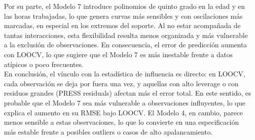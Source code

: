 \documentclass[12pt,a4paper,onecolumn]{article}
\begin{document}
Por su parte, el Modelo 7 introduce polinomios de quinto grado en la edad y en las horas trabajadas, lo que genera curvas más sensibles y con oscilaciones más marcadas, en especial en los extremos del soporte. Al no estar acompañada de tantas interacciones, esta flexibilidad resulta menos organizada y más vulnerable a la exclusión de observaciones. En consecuencia, el error de predicción aumenta con LOOCV, lo que sugiere que el Modelo 7 es más inestable frente a datos atípicos o poco frecuentes.\\

En conclusión, el vínculo con la estadística de influencia es directo: en LOOCV, cada observación se deja por fuera una vez, y aquellas con alto leverage o con residuos grandes (PRESS residuals) afectan más el error total. En este sentido, es probable que el Modelo 7 sea más vulnerable a observaciones influyentes, lo que explica el aumento en su RMSE bajo LOOCV. El Modelo 4, en cambio, parece menos sensible a estas observaciones, lo que lo convierte en una especificación más estable frente a posibles outliers o casos de alto apalancamiento.





\pagebreak
\singlespacing

\pagebreak
\end{document}

